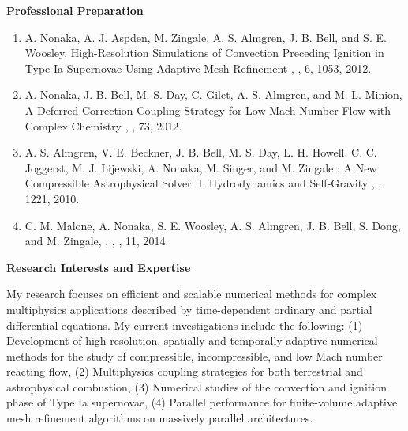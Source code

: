 \documentclass[11pt,letterpaper,english]{article}
\begin{document}
{\begin{flushleft} {\bf Professional Preparation}
\begin{enumerate}
\item A. Nonaka, A. J. Aspden, M. Zingale, A. S. Almgren, J. B. Bell, and S. E. Woosley,
\newblock High-Resolution Simulations of Convection Preceding Ignition in Type Ia Supernovae Using Adaptive Mesh Refinement
,
, 6, 1053, 2012. \\ 

\item A. Nonaka, J. B. Bell, M. S. Day, C. Gilet, A. S. Almgren, and M. L. Minion,
\newblock A Deferred Correction Coupling Strategy for Low Mach Number Flow with Complex Chemistry
, 
, 73, 2012. \\ 

\item A. S. Almgren, V. E. Beckner, J. B. Bell, M. S. Day, L. H. Howell, C. C. Joggerst, M. J. Lijewski, A. Nonaka, M. Singer, and M. Zingale
: A New Compressible Astrophysical Solver. I. Hydrodynamics and Self-Gravity
, 
, 1221, 2010. \\ 

\item C. M. Malone, A. Nonaka, S. E. Woosley, A. S. Almgren, J. B. Bell, S. Dong, and M. Zingale, 
,
, , 11, 2014.  \\ 

\end{enumerate} 

\vspace{-6pt}
{\bf Research Interests and Expertise}
{\parindent 12pt

My research focuses on efficient and scalable numerical methods for complex multiphysics applications described by time-dependent ordinary
and partial differential equations.  My current investigations include the following:
(1) Development of high-resolution, spatially and temporally adaptive numerical methods for the study of compressible, incompressible, 
and low Mach number reacting flow,
(2) Multiphysics coupling strategies for both terrestrial and astrophysical combustion,
(3) Numerical studies of the convection and ignition phase of Type Ia supernovae,
(4) Parallel performance for finite-volume adaptive mesh refinement algorithms on massively parallel architectures.
}


\end{flushleft}}
\end{document}
